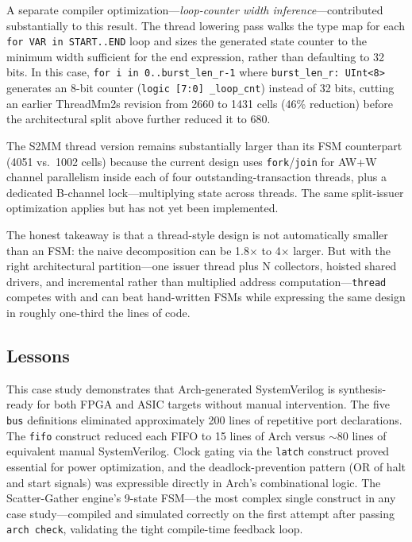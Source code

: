 \documentclass[manuscript]{acmart}
\begin{document}
A separate compiler optimization---\emph{loop-counter width inference}---contributed substantially to this result. The thread lowering pass walks the type map for each \texttt{for VAR in START..END} loop and sizes the generated state counter to the minimum width sufficient for the end expression, rather than defaulting to 32 bits. In this case, \texttt{for i in 0..burst\_len\_r-1} where \texttt{burst\_len\_r: UInt<8>} generates an 8-bit counter (\texttt{logic [7:0] \_loop\_cnt}) instead of 32 bits, cutting an earlier ThreadMm2s revision from 2660 to 1431 cells (46\% reduction) before the architectural split above further reduced it to 680.

The S2MM thread version remains substantially larger than its FSM counterpart (4051 vs.\ 1002 cells) because the current design uses \texttt{fork}/\texttt{join} for AW+W channel parallelism inside each of four outstanding-transaction threads, plus a dedicated B-channel lock---multiplying state across threads. The same split-issuer optimization applies but has not yet been implemented.

The honest takeaway is that a thread-style design is not automatically smaller than an FSM: the naive decomposition can be 1.8$\times$ to 4$\times$ larger. But with the right architectural partition---one issuer thread plus N collectors, hoisted shared drivers, and incremental rather than multiplied address computation---\texttt{thread} competes with and can beat hand-written FSMs while expressing the same design in roughly one-third the lines of code.

\subsection{Lessons}

This case study demonstrates that Arch-generated SystemVerilog is synthesis-ready for both FPGA and ASIC targets without manual intervention. The five \texttt{bus} definitions eliminated approximately 200 lines of repetitive port declarations. The \texttt{fifo} construct reduced each FIFO to 15 lines of Arch versus ${\sim}$80 lines of equivalent manual SystemVerilog. Clock gating via the \texttt{latch} construct proved essential for power optimization, and the deadlock-prevention pattern (OR of halt and start signals) was expressible directly in Arch's combinational logic. The Scatter-Gather engine's 9-state FSM---the most complex single construct in any case study---compiled and simulated correctly on the first attempt after passing \texttt{arch check}, validating the tight compile-time feedback loop.
\end{document}
